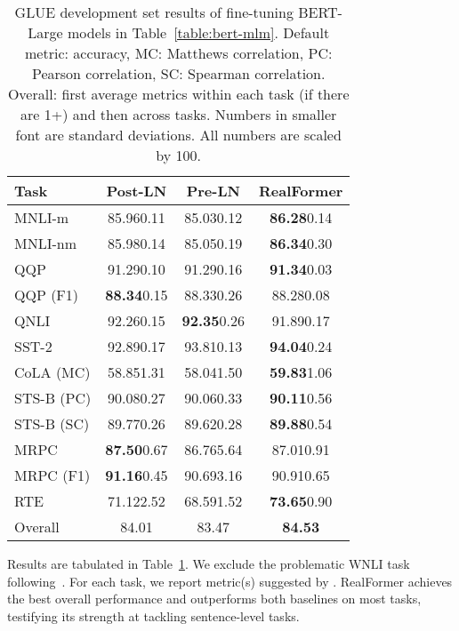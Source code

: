 \documentclass[11pt,a4paper]{article}
\begin{document}
\begin{table}[t]
\setlength{\tabcolsep}{3.5pt}
\centering
\begin{tabular}{l|ccc}
\hline 
\textbf{Task}      & \textbf{Post-LN}     & \textbf{Pre-LN}       & \textbf{RealFormer}      \\ \hline
MNLI-m             & 85.96\tiny{0.11}  & 85.03\tiny{0.12}   & \textbf{86.28}\tiny{0.14}  \\
MNLI-nm            & 85.98\tiny{0.14}  & 85.05\tiny{0.19}   & \textbf{86.34}\tiny{0.30}  \\
QQP                & 91.29\tiny{0.10}  & 91.29\tiny{0.16}   & \textbf{91.34}\tiny{0.03}  \\
QQP \small{(F1)}   & \textbf{88.34}\tiny{0.15}  & 88.33\tiny{0.26}   & 88.28\tiny{0.08}  \\
QNLI               & 92.26\tiny{0.15}  & \textbf{92.35}\tiny{0.26}   & 91.89\tiny{0.17}  \\
SST-2              & 92.89\tiny{0.17}  & 93.81\tiny{0.13}   & \textbf{94.04}\tiny{0.24}  \\
CoLA \small{(MC)}  & 58.85\tiny{1.31}  & 58.04\tiny{1.50}   & \textbf{59.83}\tiny{1.06}  \\
STS-B \small{(PC)} & 90.08\tiny{0.27}  & 90.06\tiny{0.33}   & \textbf{90.11}\tiny{0.56}  \\
STS-B \small{(SC)} & 89.77\tiny{0.26}  & 89.62\tiny{0.28}   & \textbf{89.88}\tiny{0.54}  \\
MRPC               & \textbf{87.50}\tiny{0.67}  & 86.76\tiny{5.64}   & 87.01\tiny{0.91}  \\
MRPC \small{(F1)}  & \textbf{91.16}\tiny{0.45}  & 90.69\tiny{3.16}   & 90.91\tiny{0.65}  \\
RTE                & 71.12\tiny{2.52}  & 68.59\tiny{1.52}   & \textbf{73.65}\tiny{0.90}  \\ \hline
Overall            & 84.01                  & 83.47                   & \textbf{84.53}  \\
\hline
\end{tabular}
\caption{\label{table:glue} GLUE development set results of fine-tuning BERT-Large models in Table~\ref{table:bert-mlm}. Default metric: accuracy, MC: Matthews correlation, PC: Pearson correlation, SC: Spearman correlation. Overall: first average metrics within each task (if there are 1+) and then across tasks. Numbers in smaller font are standard deviations. All numbers are scaled by 100.}
\end{table}
 
Results are tabulated in Table~\ref{table:glue}. We exclude the problematic WNLI task following~\citet{Devlin-2019-bert}. For each task, we report metric(s) suggested by \citet{Wang-2018-glue}. RealFormer achieves the best overall performance and outperforms both baselines on most tasks, testifying its strength at tackling sentence-level tasks.
\end{document}
